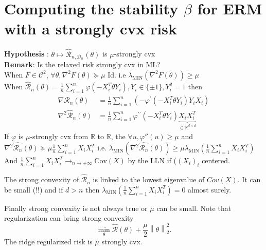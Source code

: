 \section{Computing the stability $\beta $ for ERM with a strongly cvx risk} 

\textbf{Hypothesis} : $\theta \mapsto \hat{\mathcal{R}}_ {n, \mathcal{D}_n}(\theta )$ is $\mu $-strongly cvx \\
\textbf{Remark}: Is the relaxed risk strongly cvx in ML? \\
When $F \in  \mathcal{C}^2$, $\forall \theta,  \nabla ^2 F(\theta ) \succcurlyeq \mu$ Id. i.e $\lambda_{\text{MIN}}(\nabla ^2 F(\theta )) \geq \mu $ \\
When $ \hat{\mathcal{R}}_n (\theta ) = \frac{1}{n} \sum_{i=1}^{n} \varphi (-X_i^T \theta Y_i), Y_i \in \{\pm 1\}, Y_i^2 = 1 $ then \begin{align*}
    \nabla \hat{\mathcal{R }}_n (\theta ) &= \frac{1}{n }\sum_{i=1 }^{n } ( -\varphi ^\prime  (-X_i^T \theta Y_i ) Y_i X_i) \\
    \nabla ^2 \hat{\mathcal{R }}_n (\theta ) &= \frac{1}{n } \sum_{i=1 }^{n } \varphi ^{\prime \prime } (-X_i^T \theta Y_i ) \underbrace{X_i X_i^T}_{\in \mathbb{R}^{d \times d}}
\end{align*}
If $\varphi $ is $\mu$-strongly cvx from $\mathbb{R}$ to $\mathbb{R}$, the $\forall u, \varphi ''(u) \geq \mu  $ and $\nabla ^2 \hat{\mathcal{R}_n}(\theta ) \succcurlyeq \mu  \frac{1}{n} \sum_{i=1}^{n} X_i X_i^T$ i.e. $ \lambda _{\text{MIN}}(\nabla ^2 \hat{\mathcal{R}_n}(\theta )) \geq \mu \lambda _{\text{MIN}}(\frac{1}{n} \sum_{i=1}^{n} X_i X_i^T)  $\\
And $\frac{1}{n} \sum_{i=1}^{n} X_i X_i^T \to_{n \to + \infty } \text{Cov}(X)$ by the LLN if ($(X_i)_i$ centered.

The strong convexity of $ \hat{\mathcal{R }}_n  $ is linked to the lowest eigenvalue of $ Cov(X) $. It can be small (!!) and if $ d > n  $ then $ \lambda _{\text{MIN}} ( \frac{1 }{n } \sum_{i=1 }^{n } X_i X_i^T ) = 0 $ almost surely.

Finally strong convexity is not always true or $\mu $ can be small. Note that regularization can bring strong convexity 
\[
    \min _{\theta } \hat{\mathcal{R}}(\theta ) + \frac{\mu}{2 } \left\| \theta  \right\|^2_2 
.\]
The ridge regularized risk is $\mu $ strongly cvx.


